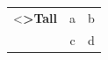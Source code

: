 \documentclass{article}
\begin{document}
\begin{NiceTabular}{ccc}
<\bfseries>{Tall} & a & b \\
 & c & d \\
\end{NiceTabular}
\end{document}
